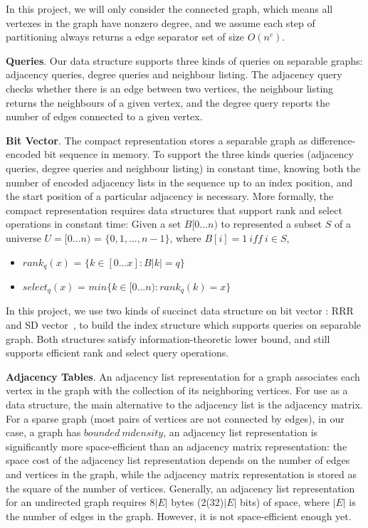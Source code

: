 \documentclass[12pt,glossary]{dalthesis}
\begin{document}
\bigskip
\bigskip

In this project, we will only consider the connected graph, which means all vertexes in the graph have nonzero degree, and we assume each step of partitioning always returns a edge separator set of size $O(n^{c})$.

\bigskip
\bigskip

\textbf{Queries}. Our data structure supports three kinds of queries on separable graphs: adjacency queries, degree queries and neighbour listing. The adjacency query checks whether there is an edge between two vertices, the neighbour listing returns the neighbours of a given vertex, and the degree query reports the number of edges connected to a given vertex.

\bigskip
\bigskip

\textbf{Bit Vector}. The compact representation stores a separable graph as difference-encoded bit sequence in memory. To support the three kinds queries (adjacency queries, degree queries and neighbour listing) in constant time, knowing both the number of encoded adjacency lists in the sequence up to an index position, and the start position of a particular adjacency is necessary. More formally, the compact representation requires data structures that support rank and select operations in constant time: Given a set $B[0...n)$ to represented a subset $S$ of a universe $U = [0...n)$ = $\{0,1,...,n-1 \}$, where $B[i] = 1 \ iff \ i \in S$,

\begin{itemize}[noitemsep]
\item $rank_{q}(x)$ = $\{k \in [0...x] : B|k| = q \}$
\item $select_{q}(x)$ = $ min \{ k \in [0...n) : rank_{q}(k) = x \} $ 
\end{itemize}

\bigskip

In this project, we use two kinds of succinct data structure on bit vector : RRR~\cite{RRR} and SD vector~\cite{SD-vector}, to build the index structure which supports queries on separable graph. Both structures satisfy information-theoretic lower bound, and still supports efficient rank and select query operations.

\bigskip
\bigskip

\textbf{Adjacency Tables}. An adjacency list representation for a graph associates each vertex in the graph with the collection of its neighboring vertices. For use as a data structure, the main alternative to the adjacency list is the adjacency matrix. For a sparse graph (most pairs of vertices are not connected by edges), in our case, a graph has $bounded \ mdensity$, an adjacency list representation is significantly more space-efficient than an adjacency matrix representation: the space cost of the adjacency list representation depends on the number of edges and vertices in the graph, while the adjacency matrix representation is stored as the square of the number of vertices. Generally, an adjacency list representation for an undirected graph requires 8$|E|$ bytes (2(32)$|E|$ bits) of space, where $|E|$ is the number of edges in the graph. However, it is not space-efficient enough yet.
\end{document}
